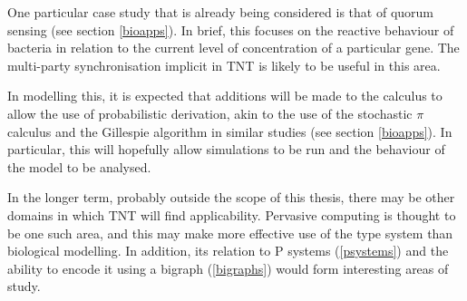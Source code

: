 One particular case study that is already being considered is that of
quorum sensing (see section \ref{bioapps}).  In brief, this
focuses on the reactive behaviour of bacteria in relation to the current
level of concentration of a particular gene.  The multi-party
synchronisation implicit in TNT is likely to be useful in this area.

In modelling this, it is expected that additions will be made to the
calculus to allow the use of probabilistic derivation, akin to the use
of the stochastic $\pi$ calculus and the Gillespie algorithm in similar
studies (see section \ref{bioapps}).  In particular, this will hopefully
allow simulations to be run and the behaviour of the model to be
analysed.

In the longer term, probably outside the scope of this thesis, there may
be other domains in which TNT will find applicability.  Pervasive
computing is thought to be one such area, and this may make more
effective use of the type system than biological modelling.  In
addition, its relation to P systems (\ref{psystems}) and the ability to
encode it using a bigraph (\ref{bigraphs}) would form interesting areas
of study.